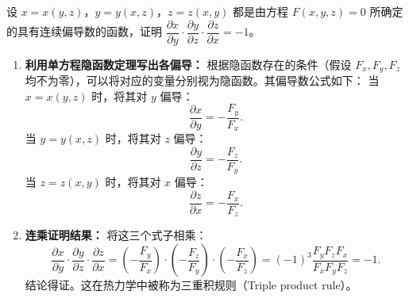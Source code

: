 \documentclass[lang=cn,11pt]{elegantbook}
\begin{document}
\begin{exercise}[隐函数偏导数的轮换对称性]
设 $x = x(y,z)$，$y = y(x,z)$，$z = z(x,y)$ 都是由方程 $F(x,y,z) = 0$ 所确定的具有连续偏导数的函数，证明 $\dfrac{\partial x}{\partial y} \cdot \dfrac{\partial y}{\partial z} \cdot \dfrac{\partial z}{\partial x} = -1$。
\end{exercise}
\begin{solution}
\begin{enumerate}
  \item \textbf{利用单方程隐函数定理写出各偏导：}
  根据隐函数存在的条件（假设 $F_x, F_y, F_z$ 均不为零），可以将对应的变量分别视为隐函数。其偏导数公式如下：
  当 $x = x(y,z)$ 时，将其对 $y$ 偏导：
  \[ \frac{\partial x}{\partial y} = -\frac{F_y}{F_x}. \]
  当 $y = y(x,z)$ 时，将其对 $z$ 偏导：
  \[ \frac{\partial y}{\partial z} = -\frac{F_z}{F_y}. \]
  当 $z = z(x,y)$ 时，将其对 $x$ 偏导：
  \[ \frac{\partial z}{\partial x} = -\frac{F_x}{F_z}. \]

  \item \textbf{连乘证明结果：}
  将这三个式子相乘：
  \[ \frac{\partial x}{\partial y} \cdot \frac{\partial y}{\partial z} \cdot \frac{\partial z}{\partial x} = \left(-\frac{F_y}{F_x}\right) \cdot \left(-\frac{F_z}{F_y}\right) \cdot \left(-\frac{F_x}{F_z}\right) = (-1)^3 \frac{F_y F_z F_x}{F_x F_y F_z} = -1. \]
  结论得证。这在热力学中被称为三重积规则（Triple product rule）。
\end{enumerate}
\end{solution}
\end{document}
